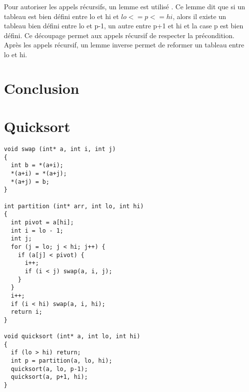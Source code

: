 \documentclass[11pt,openany]{article}
\begin{document}
		Pour autoriser les appels r\'ecursifs, un lemme est utilis\'e . Ce lemme dit que si un tableau est bien d\'efini entre lo et hi et $lo <= p<=hi$, alors il existe un tableau bien d\'efini entre lo et p-1, un autre entre p+1 et hi et la case p est bien d\'efini. Ce d\'ecoupage permet aux appels r\'ecursif de respecter la pr\'econdition. Apr\`es les appels r\'ecursif, un lemme inverse permet de reformer un tableau entre lo et hi.
		
		
\section{Conclusion}





\appendix
\section*{Quicksort}
\begin{lstlisting}
void swap (int* a, int i, int j)
{
  int b = *(a+i);
  *(a+i) = *(a+j);
  *(a+j) = b;
}

int partition (int* arr, int lo, int hi)
{
  int pivot = a[hi];
  int i = lo - 1;
  int j;
  for (j = lo; j < hi; j++) {
    if (a[j] < pivot) {
      i++;
      if (i < j) swap(a, i, j);
    }
  }
  i++;
  if (i < hi) swap(a, i, hi);
  return i;
}

void quicksort (int* a, int lo, int hi)
{
  if (lo > hi) return;
  int p = partition(a, lo, hi);
  quicksort(a, lo, p-1);
  quicksort(a, p+1, hi);
}

		\end{lstlisting}
\end{document}
